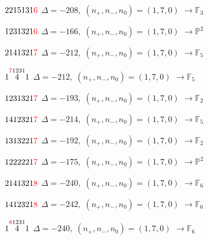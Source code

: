 \documentclass[10pt]{article}
\begin{document}
\smallskip

$2215131\textcolor{red}{6}$ \quad $\Delta=-208,\; (n_+,n_-,n_0)=(1,7,0)$ \quad $\to \mathbb{F}_{3}$

\smallskip

$1231321\textcolor{red}{6}$ \quad $\Delta=-166,\; (n_+,n_-,n_0)=(1,7,0)$ \quad $\to \mathbb{P}^2$

\smallskip

$2141321\textcolor{red}{7}$ \quad $\Delta=-212,\; (n_+,n_-,n_0)=(1,7,0)$ \quad $\to \mathbb{F}_{5}$

\smallskip

$1\overset{\textcolor{red}{7}1231}{4}1$ \quad $\Delta=-212,\; (n_+,n_-,n_0)=(1,7,0)$ \quad $\to \mathbb{F}_{5}$

\smallskip

$1231321\textcolor{red}{7}$ \quad $\Delta=-193,\; (n_+,n_-,n_0)=(1,7,0)$ \quad $\to \mathbb{F}_{2}$

\smallskip

$1412321\textcolor{red}{7}$ \quad $\Delta=-214,\; (n_+,n_-,n_0)=(1,7,0)$ \quad $\to \mathbb{F}_{5}$

\smallskip

$1313221\textcolor{red}{7}$ \quad $\Delta=-192,\; (n_+,n_-,n_0)=(1,7,0)$ \quad $\to \mathbb{F}_{2}$

\smallskip

$1222221\textcolor{red}{7}$ \quad $\Delta=-175,\; (n_+,n_-,n_0)=(1,7,0)$ \quad $\to \mathbb{P}^2$

\smallskip

$2141321\textcolor{red}{8}$ \quad $\Delta=-240,\; (n_+,n_-,n_0)=(1,7,0)$ \quad $\to \mathbb{F}_{6}$

\smallskip

$1412321\textcolor{red}{8}$ \quad $\Delta=-242,\; (n_+,n_-,n_0)=(1,7,0)$ \quad $\to \mathbb{F}_{6}$

\smallskip

$1\overset{\textcolor{red}{8}1231}{4}1$ \quad $\Delta=-240,\; (n_+,n_-,n_0)=(1,7,0)$ \quad $\to \mathbb{F}_{6}$
\end{document}

